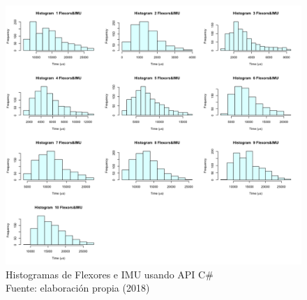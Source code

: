 \begin{figure}
 \begin{center} 
   	\includegraphics[width=1.0\textwidth]{evaluation/graphics/Xamarin/Galaxy-APITest/HistFlexors&IMUXamarinGalaxy-APITest.png}
   \centering
    \caption[Histogramas de Flexores e IMU usando API C\#]{Histogramas de Flexores e IMU usando API C\# \\Fuente: elaboración propia (2018)}
    \label{fig:xamarin-galaxy-hist-flexors&imu-api}
  \end{center}
\end{figure}


